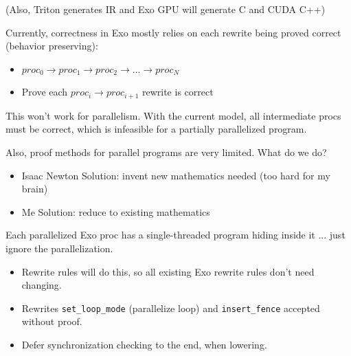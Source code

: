 \vspace{6mm}
\hfill(Also, Triton generates IR and Exo GPU will generate C and CUDA C++)

\newpage
{} \hfill {}

\begin{minipage}[t]{0.5\textwidth}\fixminipage
Currently, correctness in Exo mostly relies on each rewrite being proved correct (behavior preserving):
\begin{itemize}
  \item $proc_0 \to proc_1 \to proc_2 \to ... \to proc_N$
  \item Prove each $proc_i \to proc_{i+1}$ rewrite is correct
\end{itemize}
This won't work for parallelism.
With the current model, all intermediate procs must be correct, which is infeasible for a partially parallelized program.

Also, proof methods for parallel programs are very limited.
What do we do?
\begin{itemize}
  \item Isaac Newton Solution: invent new mathematics needed (too hard for my brain)
  \item Me Solution: reduce to existing mathematics
\end{itemize}
 Each parallelized Exo proc has a single-threaded program hiding inside it ... just ignore the parallelization.
\begin{itemize}
  \item Rewrite rules will do this, so all existing Exo rewrite rules don't need changing.
  \item Rewrites \texttt{set\_loop\_mode} (parallelize loop) and \texttt{insert\_fence} accepted without proof.
  \item Defer synchronization checking to the end, when lowering.
\end{itemize}
\end{minipage}
\hfill
